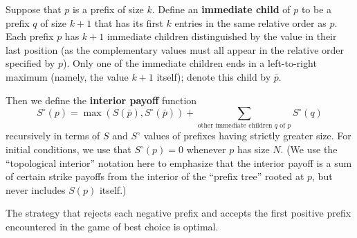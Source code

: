 \documentclass[10pt,a4paper]{amsart}
\begin{document}
\begin{definition}\label{d:sint}
Suppose that $p$ is a prefix of size $k$.  Define an {\bf immediate child} of
$p$ to be a prefix $q$ of size $k+1$ that has its first $k$ entries in the same
relative order as $p$.  Each prefix $p$ has $k+1$ immediate children
distinguished by the value in their last position (as the complementary values
must all appear in the relative order specified by $p$).  Only one of the
immediate children ends in a left-to-right maximum (namely, the value $k+1$
itself); denote this child by $\bar p$.  

Then we define the {\bf interior payoff} function
\[ S^\circ(p) = \max\left( S(\bar p), S^\circ(\bar p) \right) + \sum\limits_{\text{other immediate children $q$ of $p$}} S^\circ(q) \]
recursively in terms of $S$ and $S^\circ$ values of prefixes having strictly greater size.
For initial conditions, we use that $S^\circ(p) = 0$ whenever $p$ has size $N$.  (We use the ``topological interior'' notation here to emphasize that the
interior payoff is a sum of certain strike payoffs from the interior of the
``prefix tree'' rooted at $p$, but never includes $S(p)$ itself.)
\end{definition}

\begin{theorem}\label{t:rnap}
The strategy that rejects each negative prefix and accepts the first positive
prefix encountered in the game of best choice is optimal.
\end{theorem}
\end{document}
